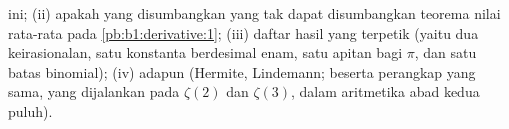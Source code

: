 \begin{problem}
\begin{enumerate}[resume]
        ini; (ii) apakah yang disumbangkan  yang tak dapat
        disumbangkan teorema nilai rata-rata pada \cref{pb:b1:derivative:1};
        (iii) daftar hasil yang terpetik (yaitu dua
        keirasionalan, satu konstanta berdesimal enam, satu
        apitan bagi $\pi$, dan satu batas binomial); (iv) adapun
         (Hermite, Lindemann; beserta perangkap yang sama, yang dijalankan pada
        $\zeta(2)$ dan $\zeta(3)$, dalam aritmetika abad
        kedua puluh).

\end{enumerate}
\end{problem}
